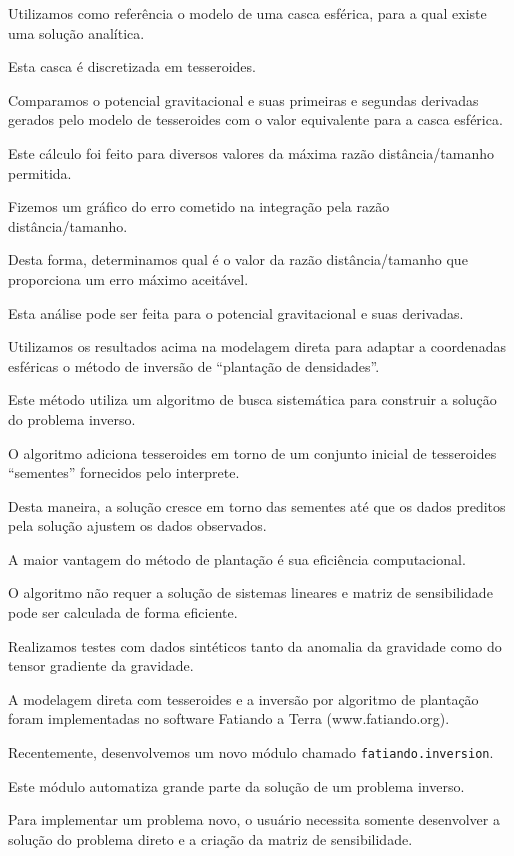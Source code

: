 \documentclass[12pt]{letter}
\begin{document}
\begin{flushleft}
Utilizamos como referência o modelo de uma casca esférica, para a qual existe
uma solução analítica.

Esta casca é discretizada em tesseroides.

Comparamos o potencial gravitacional e suas primeiras e segundas derivadas
gerados pelo modelo de tesseroides com o valor equivalente para a casca esférica.

Este cálculo foi feito para diversos valores da máxima razão distância/tamanho
permitida.

Fizemos um gráfico do erro cometido na integração pela razão
distância/tamanho.

Desta forma, determinamos qual é o valor da razão distância/tamanho que
proporciona um erro máximo aceitável.

Esta análise pode ser feita para o potencial gravitacional e suas derivadas.



Utilizamos os resultados acima na modelagem direta para adaptar a coordenadas
esféricas o método de inversão de ``plantação de densidades''.

Este método utiliza um algoritmo de busca sistemática para construir a solução
do problema inverso.

O algoritmo adiciona tesseroides em torno de um conjunto inicial de tesseroides
``sementes'' fornecidos pelo interprete.

Desta maneira, a solução cresce em torno das sementes até que os dados preditos
pela solução ajustem os dados observados.

A maior vantagem do método de plantação é sua eficiência computacional.

O algoritmo não requer a solução de sistemas lineares e matriz de sensibilidade
pode ser calculada de forma eficiente.

Realizamos testes com dados sintéticos tanto da anomalia da gravidade como
do tensor gradiente da gravidade.




A modelagem direta com tesseroides e a inversão por algoritmo de plantação
foram implementadas no software Fatiando a Terra (www.fatiando.org).

Recentemente, desenvolvemos um novo módulo chamado \texttt{fatiando.inversion}.

Este módulo automatiza grande parte da solução de um problema inverso.

Para implementar um problema novo, o usuário necessita somente desenvolver a
solução do problema direto e a criação da matriz de sensibilidade.


\end{flushleft}
\end{document}
